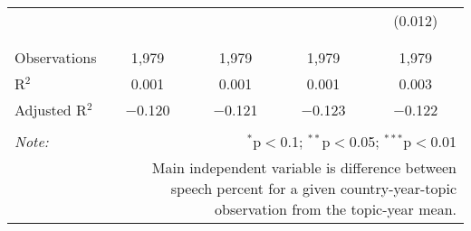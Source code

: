 \begin{table}[!htbp]
\begin{tabular}{@{\extracolsep{5pt}}lcccc}
  &  &  &  & (0.012) \\ 
  & & & & \\ 
\hline \\[-1.8ex] 
Observations & 1,979 & 1,979 & 1,979 & 1,979 \\ 
R$^{2}$ & 0.001 & 0.001 & 0.001 & 0.003 \\ 
Adjusted R$^{2}$ & $-$0.120 & $-$0.121 & $-$0.123 & $-$0.122 \\ 
\hline 
\hline \\[-1.8ex] 
\textit{Note:}  & \multicolumn{4}{r}{$^{*}$p$<$0.1; $^{**}$p$<$0.05; $^{***}$p$<$0.01} \\ 
 & \multicolumn{4}{r}{Main independent variable is difference between speech percent for a given country-year-topic observation from the topic-year mean.} \\ 
\end{tabular} 
\end{table} 
